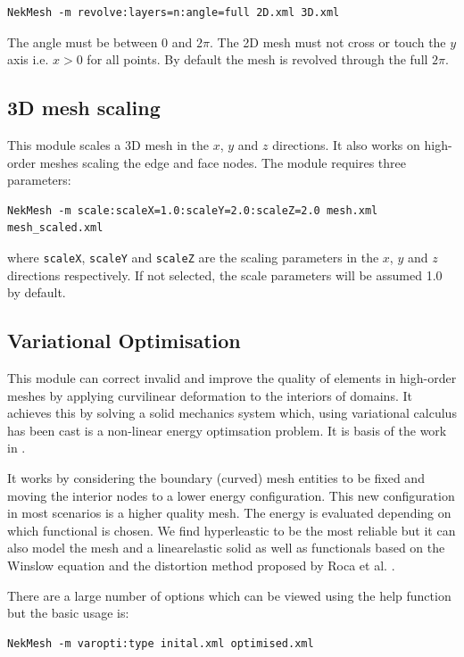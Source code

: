 \begin{lstlisting}[style=BashInputStyle]
NekMesh -m revolve:layers=n:angle=full 2D.xml 3D.xml
\end{lstlisting}

The angle must be between $0$ and $2\pi$.
The 2D mesh must not cross or touch the $y$ axis i.e. $x>0$ for all points.
By default the mesh is revolved through the full $2\pi$.

\subsection{3D mesh scaling}
This module scales a 3D mesh in the $x$, $y$ and $z$ directions. It also works on
high-order meshes scaling the edge and face nodes. The module requires three parameters:

\begin{lstlisting}[style=BashInputStyle]
  NekMesh -m scale:scaleX=1.0:scaleY=2.0:scaleZ=2.0 mesh.xml mesh_scaled.xml
\end{lstlisting}

where \texttt{scaleX}, \texttt{scaleY} and \texttt{scaleZ} are the scaling
parameters in the $x$, $y$ and $z$ directions respectively. If not selected,
the scale parameters will be assumed 1.0 by default. 


\subsection{Variational Optimisation}
\label{sec:varopti}
This module can correct invalid and improve the quality of elements in
high-order meshes by applying curvilinear deformation to the interiors of
domains. It achieves this by solving a solid mechanics system which, using
variational calculus has been cast is a non-linear energy optimsation problem.
It is basis of the work in \cite{TuPeMo16}.

It works by considering the boundary (curved) mesh entities to be fixed and
moving the interior nodes to a lower  energy configuration. This new
configuration in most scenarios is a higher quality mesh. The energy is
evaluated depending on which functional is chosen. We find hyperleastic to be
the most reliable but it can also model the mesh and a linearelastic solid as
well as functionals based on the Winslow equation and the distortion method
proposed by Roca et al. \cite{GaRoPeSa15}.

There are a large number of options which can be viewed using the help function
but the basic usage is:
\begin{lstlisting}[style=BashInputStyle]
  NekMesh -m varopti:type inital.xml optimised.xml
\end{lstlisting}

